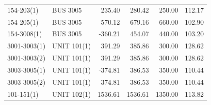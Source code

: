 \documentclass[10pt]{report}
\begin{document}
\begin{table}[H]
{\begin{tabular}{llrrrr}
154-203(1) & BUS 3005 & 235.40 & 280.42 & 250.00 & 112.17 \\
154-205(1) & BUS 3005 & 570.12 & 679.16 & 660.00 & 102.90 \\
154-3008(1) & BUS 3005 & -360.21 & 454.07 & 440.00 & 103.20 \\
3001-3003(1) & UNIT 101(1) & 391.29 & 385.86 & 300.00 & 128.62 \\
3001-3003(2) & UNIT 101(1) & 391.29 & 385.86 & 300.00 & 128.62 \\
3003-3005(1) & UNIT 101(1) & -374.81 & 386.53 & 350.00 & 110.44 \\
3003-3005(2) & UNIT 101(1) & -374.81 & 386.53 & 350.00 & 110.44 \\
101-151(1) & UNIT 102(1) & 1536.61 & 1536.61 & 1350.00 & 113.82 \\
\bottomrule
\end{tabular}}
\end{table}
\end{document}
